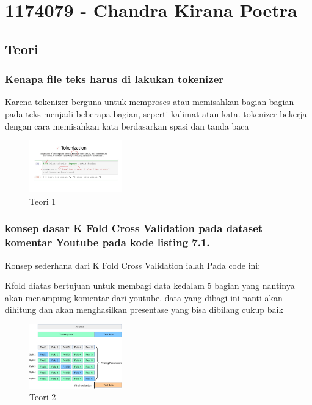 \section{1174079 - Chandra Kirana Poetra}
\subsection{Teori}
\subsubsection{Kenapa file teks harus di lakukan tokenizer}
\hfill\break
Karena tokenizer berguna untuk memproses atau memisahkan bagian bagian pada teks menjadi beberapa bagian, seperti kalimat atau kata. tokenizer bekerja dengan cara memisahkan kata berdasarkan spasi dan tanda baca
\begin{figure}[H]
\centering
	\includegraphics[width=4cm]{figures/1174079/7/token.jpg}
\caption{Teori 1}
\end{figure}

\subsubsection{konsep dasar K Fold Cross Validation pada dataset komentar Youtube pada kode listing 7.1.}
\hfill\break
Konsep sederhana dari K Fold Cross Validation ialah Pada code ini:

Kfold diatas bertujuan untuk membagi data kedalam 5 bagian yang nantinya akan menampung komentar dari youtube. data yang dibagi ini nanti akan dihitung dan akan menghasilkan presentase yang bisa dibilang cukup baik
\begin{figure}[H]
\centering
	\includegraphics[width=4cm]{figures/1174079/7/kfold.png}
\caption{Teori 2}
\end{figure}

